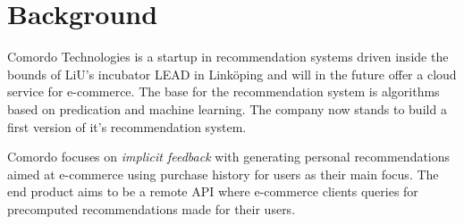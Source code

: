 
\chapter{Background}\label{cha:background}

Comordo Technologies is a startup in recommendation systems driven inside the bounds of LiU's incubator LEAD in Linköping and will in the future offer a cloud service for e-commerce. The base for the recommendation system is algorithms based on predication and machine learning. The company now stands to build a first version of it's recommendation system.

Comordo focuses on \textit{implicit feedback} with generating personal recommendations aimed at e-commerce using purchase history for users as their main focus. The end product aims to be a remote API where e-commerce clients queries for precomputed recommendations made for their users.


\newpage




